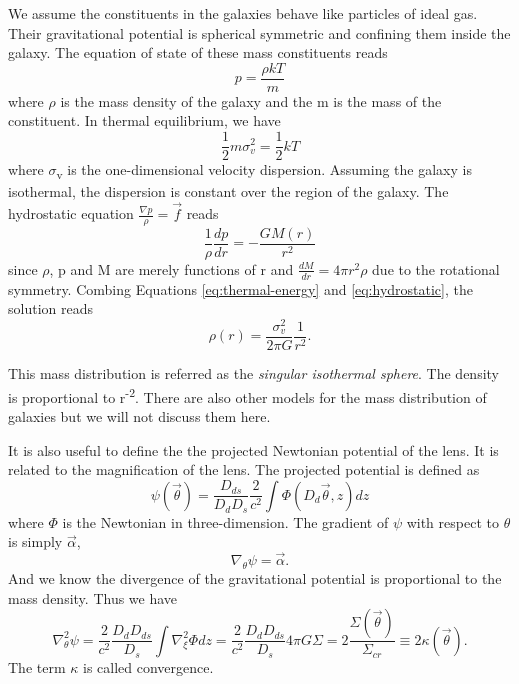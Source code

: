 \documentclass[letter,12pt]{article}
\begin{document}
We assume the constituents in the galaxies behave like particles of
ideal gas. Their gravitational potential is spherical symmetric and
confining them inside the galaxy. The equation of state of these
mass constituents reads
   \begin{equation}
p = \frac{\rho kT}{m} \label{eq:thermal-energy}
   \end{equation}
where \(\rho\) is the mass density of the galaxy and the m is the mass
of the constituent. In thermal equilibrium, we have
   \begin{equation}
\frac{1}{2} m \sigma_{v}^2 = \frac{1}{2} kT
   \end{equation}
where \(\sigma\)\textsubscript{v} is the one-dimensional velocity dispersion. Assuming
the galaxy is isothermal, the dispersion is constant over the
region of the galaxy. The hydrostatic equation
\(\frac{\nabla p}{\rho}=\vec{f}\) reads
\begin{equation}
\frac{1}{\rho} \frac{dp}{dr} = -\frac{GM(r)}{r^2} \label{eq:hydrostatic}
\end{equation}
since \(\rho\), p and M are merely functions of r and \(\frac{dM}{dr} =
  4\pi r^2 \rho\) due to the rotational symmetry. Combing Equations
\eqref{eq:thermal-energy} and \eqref{eq:hydrostatic}, the solution reads
\begin{equation}
\rho(r) = \frac{\sigma_v^2}{2\pi G}\frac{1}{r^2}.
\end{equation}

This mass distribution is referred as the \emph{singular isothermal
sphere}. The density is proportional to r\textsuperscript{-2}. There are also other
models for the mass distribution of galaxies but we will not discuss
them here.

It is also useful to define the the projected Newtonian potential of
the lens. It is related to the magnification of the lens. The projected
potential is defined as
\begin{equation}
\psi(\vec{\theta}) = \frac{D_{ds}}{D_d D_s} \frac{2}{c^2} \int \Phi(D_d \vec{\theta}, z)dz
\end{equation}
where \(\Phi\) is the Newtonian in three-dimension. The gradient of \(\psi\)
with respect to \(\theta\) is simply \(\vec{\alpha}\),
\begin{equation}
\nabla_{\theta} \psi = \vec{\alpha}.
\end{equation}
And we know the divergence of the gravitational potential is
proportional to the mass density. Thus we have
\begin{equation}
\nabla^2_{\theta} \psi = \frac{2}{c^2} \frac{D_d D_{ds}}{D_s} \int \nabla^2_\xi \Phi dz = \frac{2}{c^2}\frac{D_d D_{ds}}{D_s} 4\pi G\Sigma = 2\frac{\Sigma(\vec{\theta})}{\Sigma_{cr}}\equiv 2\kappa(\vec{\theta}).
\end{equation}
The term \(\kappa\) is called convergence.
\end{document}
